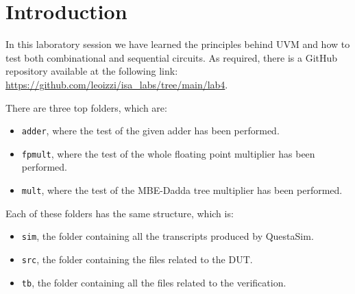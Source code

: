 \chapter{Introduction}

In this laboratory session we have learned the principles behind UVM and how to test both combinational and sequential circuits.
As required, there is a GitHub repository available at the following link: \url{https://github.com/leoizzi/isa_labs/tree/main/lab4}.

There are three top folders, which are:
\begin{itemize}
    \item \verb|adder|, where the test of the given adder has been performed.
    \item \verb|fpmult|, where the test of the whole floating point multiplier has been performed.
    \item \verb|mult|, where the test of the MBE-Dadda tree multiplier has been performed.
\end{itemize}

Each of these folders has the same structure, which is:
\begin{itemize}
    \item \verb|sim|, the folder containing all the transcripts produced by QuestaSim.
    \item \verb|src|, the folder containing the files related to the DUT.
    \item \verb|tb|, the folder containing all the files related to the verification.
\end{itemize}